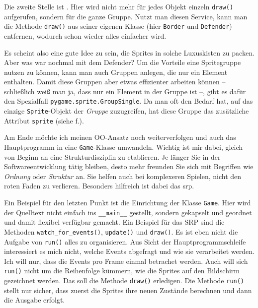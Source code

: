 Die zweite Stelle ist . Hier wird nicht mehr für jedes Objekt einzeln \texttt{draw()} aufgerufen, sondern für die ganze Gruppe. Nutzt man diesen Service, kann man die Methode \texttt{draw()} aus seiner eigenen Klasse (hier \texttt{Border} und \texttt{Defender}) entfernen, wodurch schon wieder alles einfacher wird.

Es scheint also eine gute Idee zu sein, die Sprites in solche Luxuskisten zu packen. Aber was war nochmal mit dem Defender? Um die Vorteile eine Spritegruppe nutzen zu können, kann man auch Gruppen anlegen, die nur ein Element enthalten. Damit diese Gruppen aber etwas effizienter arbeiten können -- schließlich weiß man ja, dass nur ein Element in der Gruppe ist --, gibt es dafür den Spezialfall \texttt{pygame.sprite.GroupSingle}. Da man oft den Bedarf hat, auf das einzige \texttt{Sprite}-Objekt der \emph{Gruppe} zuzugreifen, hat diese Gruppe das zusätzliche Attribut \texttt{sprite} (siehe f.).


Am Ende möchte ich meinen OO-Ansatz noch weiterverfolgen und auch das Hauptprogramm in eine \texttt{Game}-Klasse umwandeln. Wichtig ist mir dabei, gleich von Beginn an eine Strukturdisziplin zu etablieren. Je länger Sie in der Softwareentwicklung tätig bleiben, desto mehr freunden Sie sich mit Begriffen wie \emph{Ordnung} oder \emph{Struktur} an. Sie helfen auch bei komplexeren Spielen, nicht den roten Faden zu verlieren. Besonders hilfreich ist dabei das \Gls{srp}.


Ein Beispiel für den letzten Punkt ist die Einrichtung der Klasse \texttt{Game}. Hier wird der Quelltext nicht einfach ins \texttt{\_\_main\_\_} gestellt, sondern gekapselt und geordnet und damit flexibel verfügbar gemacht. Ein Beispiel für das SRP sind die Methoden \texttt{watch\_for\_e\-vents()}, \texttt{update()} und \texttt{draw()}. Es ist eben nicht die Aufgabe von \texttt{run()} alles zu organisieren. Aus Sicht der Hauptprogrammschleife interessiert es mich nicht, welche Events abgefragt und wie sie verarbeitet werden. Ich will nur, dass die Events pro Frame einmal betrachet werden. Auch will sich \texttt{run()} nicht um die Reihenfolge kümmern, wie die Sprites auf den Bildschirm gezeichnet werden. Das soll die Methode \texttt{draw()} erledigen. Die Methode \texttt{run()} stellt nur sicher, dass zuerst die Sprites ihre neuen Zustände berechnen und dann die Ausgabe erfolgt.



